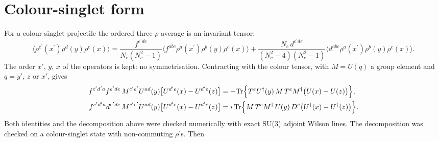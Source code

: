 \documentclass[9pt]{article}
\numberwithin{equation}{section}
\begin{document}
\section{Colour-singlet form}
For a colour-singlet projectile the ordered three-$\rho$ average is an invariant tensor:
\begin{equation}
\big\langle\rho^{e^{\prime}}(x^{\prime})\rho^{d}(y)\rho^{e}(x)\big\rangle=\frac{f^{e^{\prime}de}}{N_{c}(N_{c}^{2}-1)}\big\langle f^{abc}\rho^{a}(x^{\prime})\rho^{b}(y)\rho^{c}(x)\big\rangle+\frac{N_{c}\,d^{e^{\prime}de}}{(N_{c}^{2}-4)(N_{c}^{2}-1)}\big\langle d^{abc}\rho^{a}(x^{\prime})\rho^{b}(y)\rho^{c}(x)\big\rangle.
\end{equation}
The order $x'$, $y$, $x$ of the operators is kept: no symmetrisation. Contracting with the colour tensor, with $M=U(q)$ a group element and $q=y'$, $z$ or $x'$, gives
\begin{align}
f^{c^{\prime}d^{\prime}a}f^{e^{\prime}de}\,M^{c^{\prime}e^{\prime}}U^{ad}(y)\big[U^{d^{\prime}e}(x)-U^{d^{\prime}e}(z)\big]&=-{\rm Tr}\Big\{T^{e}U^{\dagger}(y)\,M\,T^{e}M^{\dagger}\big(U(x)-U(z)\big)\Big\},\\ f^{c^{\prime}d^{\prime}a}d^{e^{\prime}de}\,M^{c^{\prime}e^{\prime}}U^{ad}(y)\big[U^{d^{\prime}e}(x)-U^{d^{\prime}e}(z)\big]&=i\,{\rm Tr}\Big\{M\,T^{e}M^{\dagger}\,U(y)\,D^{e}\big(U^{\dagger}(x)-U^{\dagger}(z)\big)\Big\}.
\end{align}
Both identities and the decomposition above were checked numerically with exact SU(3) adjoint Wilson lines. The decomposition was checked on a colour-singlet state with non-commuting $\rho$'s. Then
\end{document}
